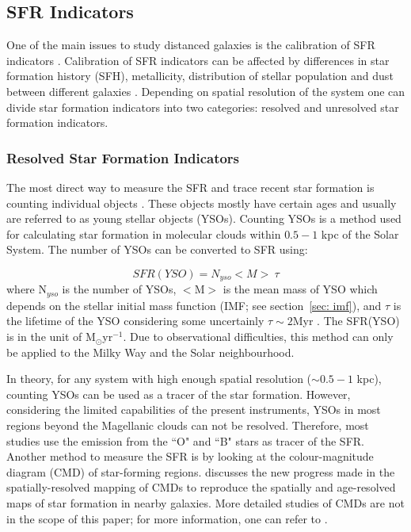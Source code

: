 \subsection{SFR Indicators}

One of the main issues to study distanced galaxies is the calibration of SFR indicators \citep[e.g.,][]{Lee10}. Calibration of SFR indicators can be affected by differences in star formation history (SFH), metallicity, distribution of stellar population and dust between different galaxies \citep{Calzetti13}. Depending on spatial resolution of the system one can divide star formation indicators into two categories: resolved and unresolved star formation indicators.

\subsubsection{Resolved Star Formation Indicators}
The most direct way to measure the SFR and trace recent star formation is counting individual objects \citep{Kennicutt12}. These objects mostly have certain ages and usually are referred to as young stellar objects (YSOs). Counting YSOs is a method used for calculating star formation in molecular clouds within $0.5- 1$ kpc of the Solar System. The number of YSOs can be converted to SFR using: 

\begin{equation}
SFR(YSO) = N_{yso} <M> \ \tau 
\end{equation}
where N$_{yso}$ is the number of YSOs, $<$M$>$ is the mean mass of YSO which depends on the stellar initial mass function (IMF; see section~\ref{sec: imf}), and $\tau$ is the lifetime of the YSO considering some uncertainly $\tau \sim 2$Myr \citep{Evans09}. The SFR(YSO) is in the unit of M$_{\odot}$yr$^{-1}$. Due to observational difficulties, this method can only be applied to the Milky Way and the Solar neighbourhood. 

In theory, for any system with high enough spatial resolution ($\sim 0.5- 1$ kpc), counting YSOs can be used as a tracer of the star formation. However, considering the limited capabilities of the present instruments, YSOs in most regions beyond the Magellanic clouds can not be resolved. Therefore, most studies use the emission from the ``O" and ``B" stars as tracer of the SFR. Another method to measure the SFR is by looking at the colour-magnitude diagram (CMD) of star-forming regions. \cite{Kennicutt12} discusses the new progress made in the spatially-resolved mapping of CMDs to reproduce the spatially and age-resolved maps of star formation in nearby galaxies. More detailed studies of CMDs are not in the scope of this paper; for more information, one can refer to \citep{Kennicutt12}. 

